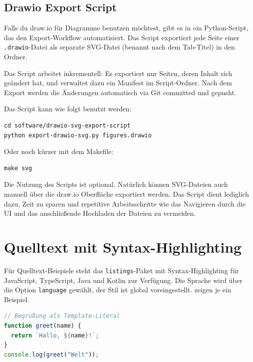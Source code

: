 \subsection{Drawio Export Script}

Falls du draw.io für Diagramme benutzen möchtest, gibt es in  ein Python-Script, das den Export-Workflow automatisiert. Das Script exportiert jede Seite einer \texttt{.drawio}-Datei als separate SVG-Datei (benannt nach dem Tab-Titel) in den  Ordner.

Das Script arbeitet inkrementell: Es exportiert nur Seiten, deren Inhalt sich geändert hat, und verwaltet dazu ein Manifest im Script-Ordner. Nach dem Export werden die Änderungen automatisch via Git committed und gepusht.

Das Script kann wie folgt benutzt werden:
\begin{verbatim}
cd software/drawio-svg-export-script
python export-drawio-svg.py figures.drawio
\end{verbatim}

Oder noch kürzer mit dem Makefile:
\begin{verbatim}
make svg
\end{verbatim}

Die Nutzung des Scripts ist optional. Natürlich können SVG-Dateien auch manuell über die draw.io Oberfläche exportiert werden. Das Script dient lediglich dazu, Zeit zu sparen und repetitive Arbeitsschritte wie das Navigieren durch die UI und das anschließende Hochladen der Dateien zu vermeiden.

\section{Quelltext mit Syntax-Highlighting}
\label{sec:listings}

Für Quelltext-Beispiele steht das \texttt{listings}-Paket mit Syntax-Highlighting für JavaScript, TypeScript, Java und Kotlin zur Verfügung. Die Sprache wird über die Option \texttt{language} gewählt, der Stil ist global voreingestellt.  zeigen je ein Beispiel.

\begin{lstlisting}[language=JavaScript, caption={JavaScript: Begrüßung}, label={lst:js}]
// Begrüßung als Template-Literal
function greet(name) {
  return `Hallo, ${name}!`;
}
console.log(greet("Welt"));
\end{lstlisting}

